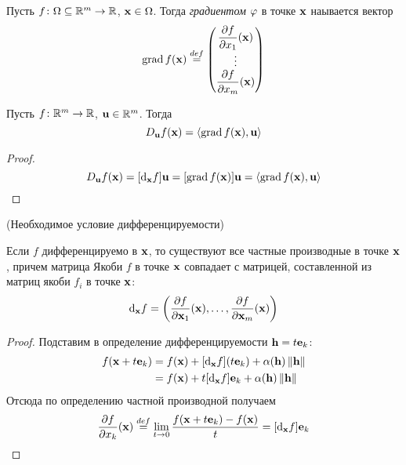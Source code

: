 \begin{definition}
    Пусть $f \colon \O \subseteq \Rm \to \R$, $\x \in \O$. Тогда
    \textit{градиентом} $\f$ в точке $\x$ наывается вектор
\[
    \grad{f}{\x} \defeq \begin{pmatrix}
        \pderv{f}{x_1}(\x) \\
        \vdots \\
        \pderv{f}{x_m}(\x)
    \end{pmatrix}
\]
\end{definition}


\begin{proposition}
    Пусть $f \colon \Rm \to \R$, $\elemvec{u} \in \Rm$. Тогда
\[
    \dder{f}{\x}{\elemvec{u}} = \langle \grad{f}{\x}, \elemvec{u} \rangle
\]
\end{proposition}
\begin{proof}
    \enewline
\[
    \dder{f}{\x}{\elemvec{u}} = [\der{f}{\x}]\elemvec{u} =
    [\grad{f}{\x}]\elemvec{u} = \langle \grad{f}{\x}, \elemvec{u} \rangle
\]
\end{proof}

\begin{proposition}(Необходимое условие дифференцируемости)

    Если $f$ дифференцируемо в $\x$, то существуют все частные производные в
    точке $\x$, причем матрица Якоби $f$ в точке $\x$ совпадает с матрицей,
    составленной из матриц якоби $f_i$ в точке $\x$:
\[
    \der{f}{\x} = \left(\pderv{f}{\x_1}(\x), \ldots, \pderv{f}{\x_m}(\x)\right)
\]
\end{proposition}
\begin{proof}

    Подставим в определение дифференцируемости $\h = t \elemvec{e}_k$:
\begin{align*}
    f(\x + t \elemvec{e}_k) &= f(\x) + [\der{f}{\x}](t \elemvec{e}_k) +
    \a(\h)\norm{\h} \\ &= f(\x) + t[\der{f}{\x}]\elemvec{e}_k +
    \a(\h)\norm{\h}
\end{align*}
    Отсюда по определению частной производной получаем
\[
    \pderv{f}{x_k}(\x) \defeq \lim_{t \to 0}{\frac{f(\x +
    t\elemvec{e}_k) - f(\x)}{t}} = [\der{f}{\x}]\elemvec{e}_k
\]
\end{proof}


